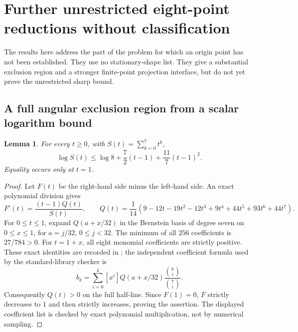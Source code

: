 \documentclass[11pt]{article}
\newtheorem{lemma}[theorem]{Lemma}
\theoremstyle{remark}
\numberwithin{equation}{section}
\begin{document}
\section{Further unrestricted eight-point reductions without classification}
\label{sec:noorigin-oct7-eight}

The results here address the part of the problem for which an origin
point has not been established. They use no stationary-shape list.
They give a substantial exclusion region and a stronger finite-point
projection interface, but do not yet prove the unrestricted sharp bound.

\subsection{A full angular exclusion region from a scalar logarithm bound}
\begin{lemma}\label{lem:noorigin-oct7-eight-tangent}
For every $t\ge0$, with $S(t)=\sum_{k=0}^7t^k$,
\[
 \log S(t)\le\log8+\frac72(t-1)+\frac{11}{7}(t-1)^2.
\]
Equality occurs only at $t=1$.
\end{lemma}
\begin{proof}
Let $F(t)$ be the right-hand side minus the left-hand side.
An exact polynomial division gives
\[
 F'(t)=\frac{(t-1)Q(t)}{S(t)},\qquad
 Q(t)=\frac{1}{14}(9-12t-19t^2-12t^3+9t^4+44t^5+93t^6+44t^7).
\]
For $0\le t\le1$, expand $Q(a+x/32)$ in the Bernstein basis
of degree seven on $0\le x\le1$, for
$a=j/32$, $0\le j<32$. The minimum of all $256$ coefficients is
$27/784>0$. For $t=1+x$, all eight monomial coefficients are strictly
positive. These exact identities are recorded in
; the independent coefficient
formula used by the standard-library checker is
\[
 b_k=\sum_{i=0}^k[x^i]Q(a+x/32)
                         \frac{\binom ki}{\binom7i}.
\]
Consequently $Q(t)>0$ on the full half-line. Since $F(1)=0$,
$F$ strictly decreases to $1$ and then strictly increases, proving
the assertion. The displayed coefficient list is checked by exact
polynomial multiplication, not by numerical sampling.
\end{proof}
\end{document}
